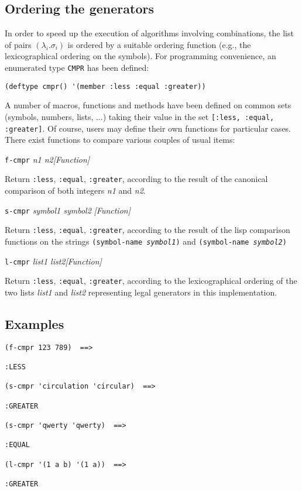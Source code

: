 \subsection {Ordering the generators}

In order to speed up the execution of algorithms involving combinations,
the list of pairs $(\lambda_i.\sigma_i)$ is ordered by a suitable ordering function (e.g., the lexicographical ordering
on the symbols). For programming convenience, an enumerated type {\tt CMPR} has been defined:
{\footnotesize\begin{verbatim}
(deftype cmpr() '(member :less :equal :greater))
\end{verbatim}}
A number of macros, functions and methods have been defined
on common sets (symbols, numbers, lists, ...) taking their value in the set
{\tt [:less, :equal, :greater]}. Of course, users may define their own functions for particular cases.
There exist functions to compare various couples of usual items:
\vskip 0.45cm
{\parindent=0mm
{\leftskip=5mm
{\tt f-cmpr} {\em n1 n2}\hfill {\em [Function]} \par}
{\leftskip=12mm
Return {\tt :less}, {\tt :equal}, {\tt :greater}, according to the result of
the canonical comparison of both integers {\em n1} and {\em n2}. \par}
{\leftskip=5mm
{\tt s-cmpr} {\em symbol1 symbol2} \hfill {\em [Function]}\par}
{\leftskip=12mm
Return  {\tt :less}, {\tt :equal}, {\tt :greater}, according to the result of
the lisp comparison functions on the strings {\tt (symbol-name {\em symbol1})}
and {\tt (symbol-name {\em symbol2})} \par}
{\leftskip=5mm
{\tt l-cmpr} {\em list1 list2}\hfill {\em [Function]} \par}
{\leftskip=12mm
Return  {\tt :less}, {\tt :equal}, {\tt :greater}, according to the
lexicographical ordering of the two lists  {\em list1}
and {\em list2} representing legal generators in this implementation. \par}
}

\subsection* {Examples}

{\footnotesize\begin{verbatim}
(f-cmpr 123 789)  ==>

:LESS

(s-cmpr 'circulation 'circular)  ==>

:GREATER

(s-cmpr 'qwerty 'qwerty)  ==>

:EQUAL

(l-cmpr '(1 a b) '(1 a))  ==>

:GREATER
\end{verbatim}}
\newpage

